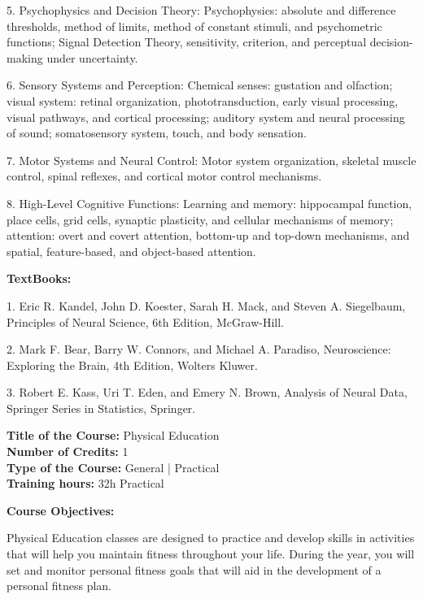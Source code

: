 \documentclass[12pt,a4paper]{article}
\begin{document}
5. Psychophysics and Decision Theory: Psychophysics: absolute and difference thresholds, method of limits, method of constant stimuli, and psychometric functions; Signal Detection Theory, sensitivity, criterion, and perceptual decision-making under uncertainty.\par
6. Sensory Systems and Perception: Chemical senses: gustation and olfaction; visual system: retinal organization, phototransduction, early visual processing, visual pathways, and cortical processing; auditory system and neural processing of sound; somatosensory system, touch, and body sensation.\par
7. Motor Systems and Neural Control: Motor system organization, skeletal muscle control, spinal reflexes, and cortical motor control mechanisms.\par
8. High-Level Cognitive Functions: Learning and memory: hippocampal function, place cells, grid cells, synaptic plasticity, and cellular mechanisms of memory; attention: overt and covert attention, bottom-up and top-down mechanisms, and spatial, feature-based, and object-based attention.\par\vspace{4pt}
\textbf{TextBooks:}\par\vspace{2pt}
1. Eric R. Kandel, John D. Koester, Sarah H. Mack, and Steven A. Siegelbaum, Principles of Neural Science, 6th Edition, McGraw-Hill.\par
2. Mark F. Bear, Barry W. Connors, and Michael A. Paradiso, Neuroscience: Exploring the Brain, 4th Edition, Wolters Kluwer.\par
3. Robert E. Kass, Uri T. Eden, and Emery N. Brown, Analysis of Neural Data, Springer Series in Statistics, Springer.\par
\vspace{4pt}

\newpage
\nopagebreak
\textbf{Title of the Course:} Physical Education\\
\textbf{Number of Credits:} 1\\
\textbf{Type of the Course:} General | Practical\\
\textbf{Training hours:} 32h Practical\par\vspace{4pt}
\textbf{Course Objectives:}\par\vspace{2pt}
Physical Education classes are designed to practice and develop skills in activities that will help
you maintain fitness throughout your life. During the year, you will set and monitor personal
fitness goals that will aid in the development of a personal fitness plan.\par\vspace{4pt}
\end{document}
